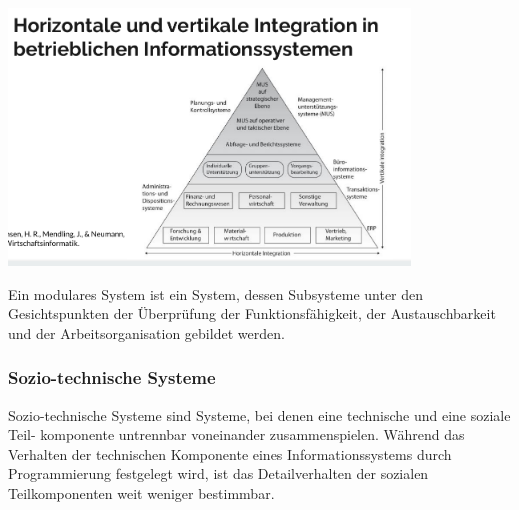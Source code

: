 \includegraphics[width=0.8\textwidth]{assets/HoriVertIntegration.PNG}
\par
Ein modulares System ist ein System, dessen Subsysteme unter den Gesichtspunkten der Überprüfung der Funktionsfähigkeit, der Austauschbarkeit und der Arbeitsorganisation gebildet werden.

\subsubsection{Sozio-technische Systeme}
\par
Sozio-technische Systeme sind Systeme, bei denen eine technische und eine soziale Teil- komponente untrennbar voneinander zusammenspielen. Während das Verhalten der technischen Komponente eines Informationssystems durch Programmierung festgelegt wird, ist das Detailverhalten der sozialen Teilkomponenten weit weniger bestimmbar.
\par
